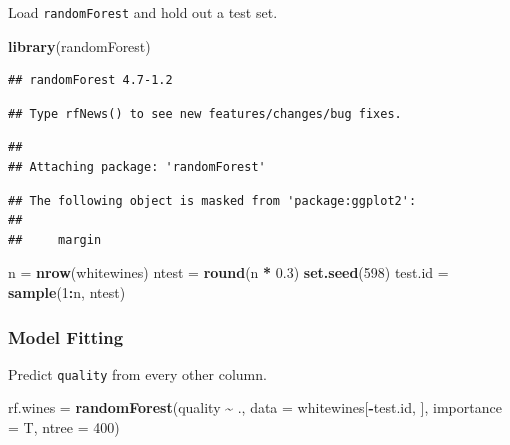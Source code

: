 \documentclass[
]{book}
\newenvironment{Shaded}{\begin{snugshade}}{\end{snugshade}}
\newcommand{\AttributeTok}[1]{\textcolor[rgb]{0.13,0.29,0.53}{#1}}
\newcommand{\DecValTok}[1]{\textcolor[rgb]{0.00,0.00,0.81}{#1}}
\newcommand{\FloatTok}[1]{\textcolor[rgb]{0.00,0.00,0.81}{#1}}
\newcommand{\FunctionTok}[1]{\textcolor[rgb]{0.13,0.29,0.53}{\textbf{#1}}}
\newcommand{\NormalTok}[1]{#1}
\newcommand{\OtherTok}[1]{\textcolor[rgb]{0.56,0.35,0.01}{#1}}
\newcommand{\SpecialCharTok}[1]{\textcolor[rgb]{0.81,0.36,0.00}{\textbf{#1}}}
\begin{document}
Load \texttt{randomForest} and hold out a test set.
~

\begin{Shaded}
\begin{Highlighting}[]
\FunctionTok{library}\NormalTok{(randomForest)}
\end{Highlighting}
\end{Shaded}

\begin{verbatim}
## randomForest 4.7-1.2
\end{verbatim}

\begin{verbatim}
## Type rfNews() to see new features/changes/bug fixes.
\end{verbatim}

\begin{verbatim}
## 
## Attaching package: 'randomForest'
\end{verbatim}

\begin{verbatim}
## The following object is masked from 'package:ggplot2':
## 
##     margin
\end{verbatim}

\begin{Shaded}
\begin{Highlighting}[]
\NormalTok{n }\OtherTok{=} \FunctionTok{nrow}\NormalTok{(whitewines)}
\NormalTok{ntest }\OtherTok{=} \FunctionTok{round}\NormalTok{(n }\SpecialCharTok{*} \FloatTok{0.3}\NormalTok{)}
\FunctionTok{set.seed}\NormalTok{(}\DecValTok{598}\NormalTok{)}
\NormalTok{test.id }\OtherTok{=} \FunctionTok{sample}\NormalTok{(}\DecValTok{1}\SpecialCharTok{:}\NormalTok{n, ntest)}
\end{Highlighting}
\end{Shaded}

\subsubsection*{Model Fitting}\label{model-fitting}

Predict \texttt{quality} from every other column.

\begin{Shaded}
\begin{Highlighting}[]
\NormalTok{rf.wines }\OtherTok{=} \FunctionTok{randomForest}\NormalTok{(quality }\SpecialCharTok{\textasciitilde{}}\NormalTok{ ., }\AttributeTok{data =}\NormalTok{ whitewines[}\SpecialCharTok{{-}}\NormalTok{test.id,}
\NormalTok{    ], }\AttributeTok{importance =}\NormalTok{ T, }\AttributeTok{ntree =} \DecValTok{400}\NormalTok{)}
\end{Highlighting}
\end{Shaded}
\end{document}
